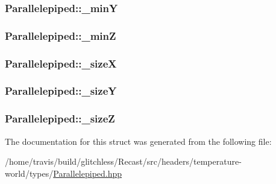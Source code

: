 \hypertarget{struct_parallelepiped_a5771e43afdf839db265e15405cb2cf06}{
\subsubsection[{\-\_\-min\-Y}]{ Parallelepiped\-::\-\_\-min\-Y\hspace{0.3cm}{\ttfamily [protected]}}}\label{struct_parallelepiped_a5771e43afdf839db265e15405cb2cf06}
\hypertarget{struct_parallelepiped_a236bbf5d0a7354f2f8c11566a9552631}{
\subsubsection[{\-\_\-min\-Z}]{ Parallelepiped\-::\-\_\-min\-Z\hspace{0.3cm}{\ttfamily [protected]}}}\label{struct_parallelepiped_a236bbf5d0a7354f2f8c11566a9552631}
\hypertarget{struct_parallelepiped_abff135261e4f3e6e8ea9c6dd185de0cd}{
\subsubsection[{\-\_\-size\-X}]{ Parallelepiped\-::\-\_\-size\-X\hspace{0.3cm}{\ttfamily [protected]}}}\label{struct_parallelepiped_abff135261e4f3e6e8ea9c6dd185de0cd}
\hypertarget{struct_parallelepiped_a722af4ec16bb4ede57cb73a527d16dbf}{
\subsubsection[{\-\_\-size\-Y}]{ Parallelepiped\-::\-\_\-size\-Y\hspace{0.3cm}{\ttfamily [protected]}}}\label{struct_parallelepiped_a722af4ec16bb4ede57cb73a527d16dbf}
\hypertarget{struct_parallelepiped_a99b032966bf653c13ca8d9645ad14b5e}{
\subsubsection[{\-\_\-size\-Z}]{ Parallelepiped\-::\-\_\-size\-Z\hspace{0.3cm}{\ttfamily [protected]}}}\label{struct_parallelepiped_a99b032966bf653c13ca8d9645ad14b5e}


The documentation for this struct was generated from the following file\-:\begin{DoxyCompactItemize}
\item 
/home/travis/build/glitchless/\-Recast/src/headers/temperature-\/world/types/\hyperlink{_parallelepiped_8hpp}{Parallelepiped.\-hpp}\end{DoxyCompactItemize}
